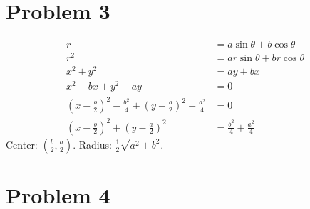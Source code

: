 \documentclass[preview, margin=0.6in]{standalone}
\newcommand*{\problem}[1]{\section*{Problem #1}}
\begin{document}
\problem{3}
\begin{align*}
	r&=a\sin\theta+b\cos\theta \\
	r^2&=ar\sin\theta+br\cos\theta \\
	x^2+y^2&=ay+bx \\
	x^2-bx+y^2-ay&=0 \\
	\left(x-\frac{b}{2}\right)^2-\frac{b^2}{4}+\left(y-\frac{a}{2}\right)^2-\frac{a^2}{4}&=0 \\
	\left(x-\frac{b}{2}\right)^2+\left(y-\frac{a}{2}\right)^2&=\frac{b^2}{4}+\frac{a^2}{4}
\end{align*}
Center: $\displaystyle \left(\frac b2, \frac a2\right)$. Radius: $\displaystyle \frac12\sqrt{a^2+b^2}$.

\problem{4}
\end{document}
